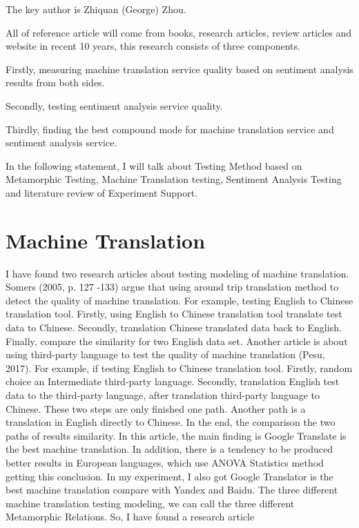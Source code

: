 \documentclass[conference]{IEEEtran}
\begin{document}
The key author is Zhiquan (George) Zhou.

All of reference article will come from books, research articles, review
articles and website in recent 10 years, this research consists of three
components.

Firstly, measuring machine translation service quality based on sentiment
analysis results from both sides.

Secondly, testing sentiment analysis service quality.

Thirdly, finding the best compound mode for machine translation service and
sentiment analysis service.

In the following statement, I will talk about Testing Method based on Metamorphic Testing, Machine Translation testing, Sentiment Analysis Testing and literature review of Experiment Support.

\section{Machine Translation}
I have found two research articles about testing modeling of machine
translation.
Somers (2005, p. 127 -133) argue that using around trip translation method to
detect the quality of machine translation.
For example, testing English to Chinese translation tool.
Firstly, using English to Chinese translation tool translate test data to
Chinese.
Secondly, translation Chinese translated data back to English.
Finally, compare the similarity for two English data set. Another article is
about using third-party language to test the quality of machine translation
(Pesu, 2017). For example, if testing English to Chinese translation tool.
Firstly, random choice an Intermediate third-party language.
Secondly, translation English test data to the third-party language, after
translation third-party language to Chinese.
These two steps are only finished one path. Another path is a translation in
English directly to Chinese.
In the end, the comparison the two paths of results similarity. In this article,
the main finding is Google Translate is the best machine translation. In
addition, there is a tendency to be produced better results in European
languages, which use ANOVA Statistics method getting this conclusion.
In my experiment, I also got Google Translator is the best machine translation compare with Yandex and Baidu.
The three different machine translation testing modeling, we can call the three
different Metamorphic Relations.
So, I have found a research article
\end{document}
